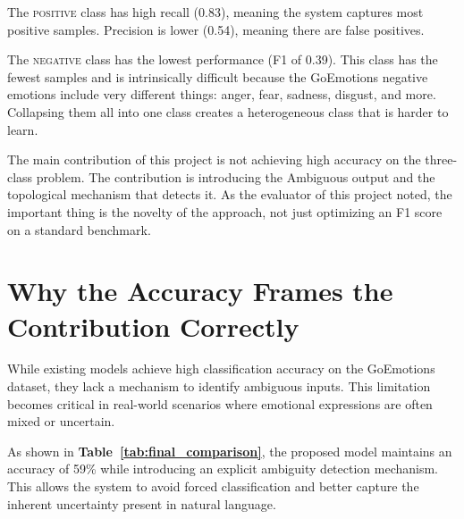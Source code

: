 The \textsc{positive} class has high recall (0.83), meaning the system captures most positive
samples. Precision is lower (0.54), meaning there are false positives.

The \textsc{negative} class has the lowest performance (F1 of 0.39). This class has the fewest
samples and is intrinsically difficult because the GoEmotions negative emotions include very
different things: anger, fear, sadness, disgust, and more. Collapsing them all into one class
creates a heterogeneous class that is harder to learn.

The main contribution of this project is not achieving high accuracy on the three-class
problem. The contribution is introducing the Ambiguous output and the topological mechanism
that detects it. As the evaluator of this project noted, the important thing is the novelty of the
approach, not just optimizing an F1 score on a standard benchmark.

\section{Why the Accuracy Frames the Contribution Correctly}

While existing models achieve high classification accuracy on the GoEmotions dataset, they lack a mechanism to identify ambiguous inputs. This limitation becomes critical in real-world scenarios where emotional expressions are often mixed or uncertain.

\begin{table}[H]
\centering
\caption{Comparison of Proposed Model with Existing GoEmotions-Based Approaches}
\label{tab:final_comparison}
\end{table}

As shown in \textbf{Table~\ref{tab:final_comparison}}, the proposed model maintains an accuracy of 59\% while introducing an explicit ambiguity detection mechanism. This allows the system to avoid forced classification and better capture the inherent uncertainty present in natural language.

